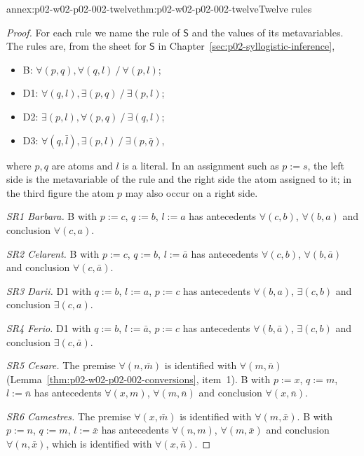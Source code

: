 \begin{annexitem}{annex:p02-w02-p02-002-twelve}{thm:p02-w02-p02-002-twelve}{Twelve rules}
\begin{proof}
For each rule we name the rule of \(\mathsf S\) and the values of its
metavariables. The rules are, from the sheet for \(\mathsf S\) in Chapter~\ref{sec:p02-syllogistic-inference},

\begin{itemize}
\item B: \(\forall(p,q),\forall(q,l)\mathbin{/}\forall(p,l)\);
\item D1: \(\forall(q,l),\exists(p,q)\mathbin{/}\exists(p,l)\);
\item D2: \(\exists(p,l),\forall(p,q)\mathbin{/}\exists(q,l)\);
\item D3: \(\forall(q,\bar l),\exists(p,l)\mathbin{/}\exists(p,\bar q)\),
\end{itemize}
where \(p,q\) are atoms and \(l\) is a literal. In an assignment
such as \(p:=s\), the left side is the metavariable of the rule and the right
side the atom assigned to it; in the third figure the atom \(p\) may also
occur on a right side.

\emph{SR1 Barbara.} B with \(p:=c\), \(q:=b\), \(l:=a\) has antecedents
\(\forall(c,b)\), \(\forall(b,a)\) and conclusion \(\forall(c,a)\).

\emph{SR2 Celarent.} B with \(p:=c\), \(q:=b\), \(l:=\bar a\) has antecedents
\(\forall(c,b)\), \(\forall(b,\bar a)\) and conclusion \(\forall(c,\bar a)\).

\emph{SR3 Darii.} D1 with \(q:=b\), \(l:=a\), \(p:=c\) has antecedents
\(\forall(b,a)\), \(\exists(c,b)\) and conclusion \(\exists(c,a)\).

\emph{SR4 Ferio.} D1 with \(q:=b\), \(l:=\bar a\), \(p:=c\) has antecedents
\(\forall(b,\bar a)\), \(\exists(c,b)\) and conclusion \(\exists(c,\bar a)\).

\emph{SR5 Cesare.} The premise \(\forall(n,\bar m)\) is identified with
\(\forall(m,\bar n)\) (Lemma~\ref{thm:p02-w02-p02-002-conversions}, item~1).
B with \(p:=x\), \(q:=m\), \(l:=\bar n\) has antecedents \(\forall(x,m)\),
\(\forall(m,\bar n)\) and conclusion \(\forall(x,\bar n)\).

\emph{SR6 Camestres.} The premise \(\forall(x,\bar m)\) is identified with
\(\forall(m,\bar x)\). B with \(p:=n\), \(q:=m\), \(l:=\bar x\) has
antecedents \(\forall(n,m)\), \(\forall(m,\bar x)\) and conclusion
\(\forall(n,\bar x)\), which is identified with \(\forall(x,\bar n)\).


\end{proof}
\end{annexitem}
